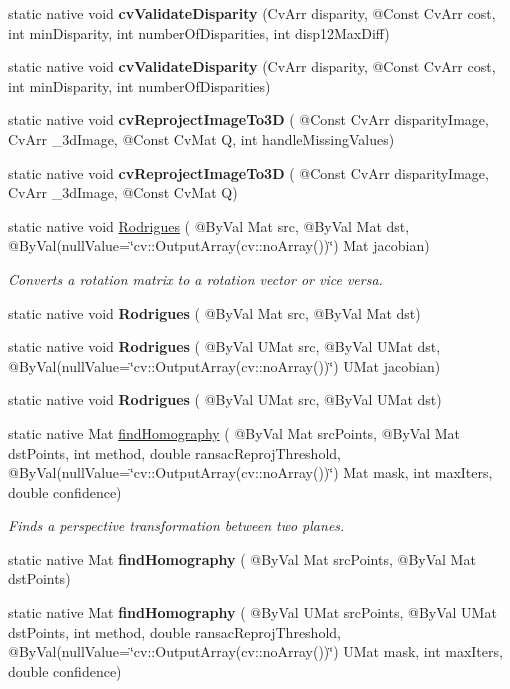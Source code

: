 \begin{DoxyCompactItemize}
static native void {\bfseries cv\+Validate\+Disparity} (Cv\+Arr disparity, @Const Cv\+Arr cost, int min\+Disparity, int number\+Of\+Disparities, int disp12\+Max\+Diff)
\item 
static native void {\bfseries cv\+Validate\+Disparity} (Cv\+Arr disparity, @Const Cv\+Arr cost, int min\+Disparity, int number\+Of\+Disparities)
\item 
static native void {\bfseries cv\+Reproject\+Image\+To3D} ( @Const Cv\+Arr disparity\+Image, Cv\+Arr \+\_\+3d\+Image, @Const Cv\+Mat Q, int handle\+Missing\+Values)
\item 
static native void {\bfseries cv\+Reproject\+Image\+To3D} ( @Const Cv\+Arr disparity\+Image, Cv\+Arr \+\_\+3d\+Image, @Const Cv\+Mat Q)
\item 
static native void \hyperlink{group__calib3d_ga20092873ec8f2850a2df8acb2648de68}{Rodrigues} ( @By\+Val Mat src, @By\+Val Mat dst, @By\+Val(null\+Value=\char`\"{}cv\+::\+Output\+Array(cv\+::no\+Array())\char`\"{}) Mat jacobian)
\begin{DoxyCompactList}\small\item\em Converts a rotation matrix to a rotation vector or vice versa. \end{DoxyCompactList}\item 
static native void {\bfseries Rodrigues} ( @By\+Val Mat src, @By\+Val Mat dst)
\item 
static native void {\bfseries Rodrigues} ( @By\+Val U\+Mat src, @By\+Val U\+Mat dst, @By\+Val(null\+Value=\char`\"{}cv\+::\+Output\+Array(cv\+::no\+Array())\char`\"{}) U\+Mat jacobian)
\item 
static native void {\bfseries Rodrigues} ( @By\+Val U\+Mat src, @By\+Val U\+Mat dst)
\item 
static native Mat \hyperlink{group__calib3d_ga2e20e41b600c13c08d376e5df367f480}{find\+Homography} ( @By\+Val Mat src\+Points, @By\+Val Mat dst\+Points, int method, double ransac\+Reproj\+Threshold, @By\+Val(null\+Value=\char`\"{}cv\+::\+Output\+Array(cv\+::no\+Array())\char`\"{}) Mat mask, int max\+Iters, double confidence)
\begin{DoxyCompactList}\small\item\em Finds a perspective transformation between two planes. \end{DoxyCompactList}\item 
static native Mat {\bfseries find\+Homography} ( @By\+Val Mat src\+Points, @By\+Val Mat dst\+Points)
\item 
static native Mat {\bfseries find\+Homography} ( @By\+Val U\+Mat src\+Points, @By\+Val U\+Mat dst\+Points, int method, double ransac\+Reproj\+Threshold, @By\+Val(null\+Value=\char`\"{}cv\+::\+Output\+Array(cv\+::no\+Array())\char`\"{}) U\+Mat mask, int max\+Iters, double confidence)

\end{DoxyCompactItemize}
